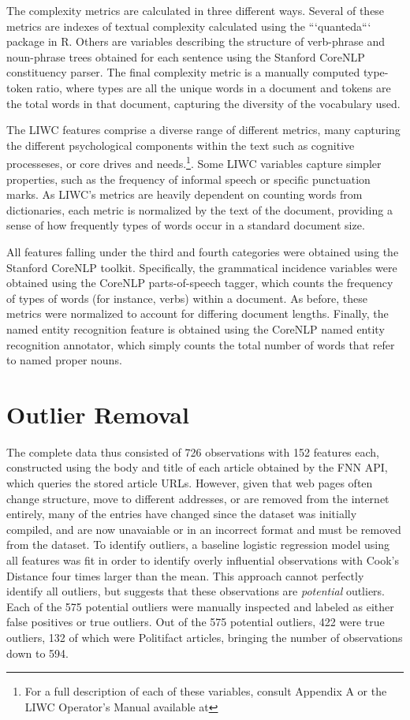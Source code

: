 \documentclass[../thesis.tex]{subfiles}
\begin{document}
The complexity metrics are calculated in three different ways. Several of these metrics are indexes of textual complexity calculated using the ```quanteda``` package in R. Others are variables describing the structure of verb-phrase and noun-phrase trees obtained for each sentence using the Stanford CoreNLP constituency parser. The final complexity metric is a manually computed type-token ratio, where types are all the unique words in a document and tokens are the total words in that document, capturing the diversity of the vocabulary used.

The LIWC features comprise a diverse range of different metrics, many capturing the different psychological components within the text such as cognitive processeses, or core drives and needs.\footnote{For a full description of each of these variables, consult Appendix A or the LIWC Operator's Manual available at}. Some LIWC variables capture simpler properties, such as the frequency of informal speech or specific punctuation marks. As LIWC's metrics are heavily dependent on counting words from dictionaries, each metric is normalized by the text of the document, providing a sense of how frequently types of words occur in a standard document size.

All features falling under the third and fourth categories were obtained using the Stanford CoreNLP toolkit. Specifically, the grammatical incidence variables were obtained using the CoreNLP parts-of-speech tagger, which counts the frequency of types of words (for instance, verbs) within a document. As before, these metrics were normalized to account for differing document lengths. Finally, the named entity recognition feature is obtained using the CoreNLP named entity recognition annotator, which simply counts the total number of words that refer to named proper nouns.

\section{Outlier Removal}

The complete data thus consisted of 726 observations with 152 features each, constructed using the body and title of each article obtained by the FNN API, which queries the stored article URLs. However, given that web pages often change structure, move to different addresses, or are removed from the internet entirely, many of the entries have changed since the dataset was initially compiled, and are now unavaiable or in an incorrect format and must be removed from the dataset. To identify outliers, a baseline logistic regression model using all features was fit in order to identify overly influential observations with Cook's Distance four times larger than the mean. This approach cannot perfectly identify all outliers, but suggests that these observations are \emph{potential} outliers. Each of the 575 potential outliers were manually inspected and labeled as either false positives or true outliers. Out of the 575 potential outliers, 422 were true outliers, 132 of which were Politifact articles, bringing the number of observations down to 594.
\end{document}
